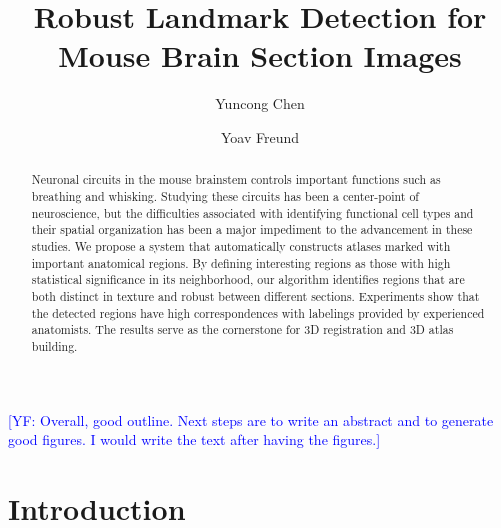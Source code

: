 \documentclass{llncs}
\newcommand{\authcmt}[2]{\textcolor{#1}{#2}}
\newcommand{\yoav}[1]{\authcmt{blue}{[YF: #1]}}
\begin{document}
%
%
\title{Robust Landmark Detection for Mouse Brain Section Images}
%
%
\author{Yuncong Chen \and Yoav Freund}
%
%
%




\maketitle              %

\begin{abstract}

Neuronal circuits in the mouse brainstem controls important functions such as breathing and whisking. Studying these circuits has been a center-point of neuroscience, but the difficulties associated with identifying functional cell types and their spatial organization has been a major impediment to the advancement in these studies. We propose a system that automatically constructs atlases marked with important anatomical regions. By defining interesting regions as those with high statistical significance in its neighborhood, our algorithm identifies regions that are both distinct in texture and robust between different sections. Experiments show that the detected regions have high correspondences with labelings provided by experienced anatomists. The results serve as the cornerstone for 3D registration and 3D atlas building.

\end{abstract}
%

\yoav{Overall, good outline. Next steps are to write an abstract and
  to generate good figures. I would write the text after having the
  figures.}

\section{Introduction}
%
\end{document}
